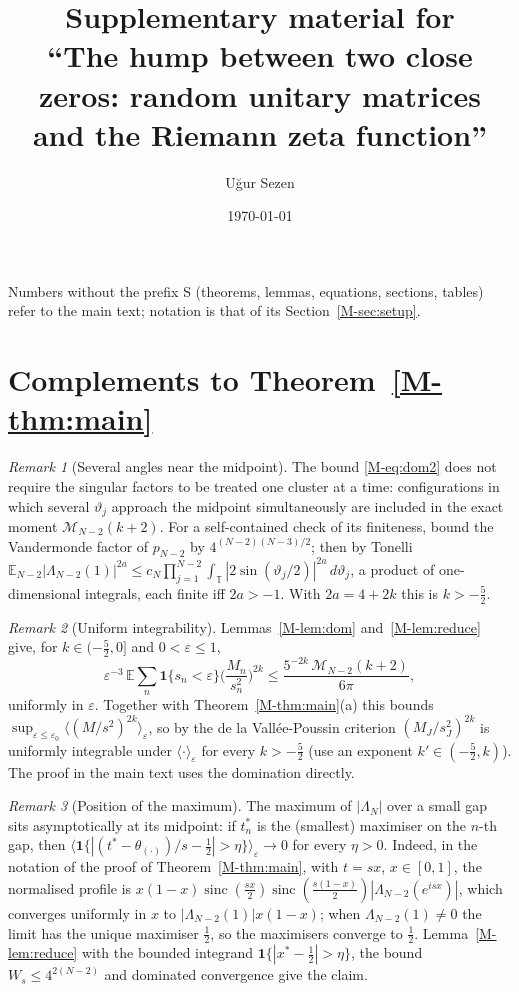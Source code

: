 \documentclass[12pt]{amsart}
\title[Supplementary material]{Supplementary material for\\ ``The hump
between two close zeros: random unitary matrices and the Riemann zeta
function''}
\author{U\u{g}ur Sezen}
\date{\today}
\theoremstyle{remark}
\newtheorem{remark}{Remark}
\newcommand{\E}{\mathbb{E}}
\newcommand{\eps}{\varepsilon}
\newcommand{\T}{\mathbb{T}}
\newcommand{\1}{\mathbf{1}}
\newcommand{\sinc}{\operatorname{sinc}}
\begin{document}
\maketitle

Numbers without the prefix S (theorems, lemmas, equations, sections,
tables) refer to the main text; notation is that of its
Section~\ref{M-sec:setup}.

\section{Complements to Theorem~\ref{M-thm:main}}\label{sec:thm1supp}

\begin{remark}[Several angles near the midpoint]\label{rem:multi}
The bound \eqref{M-eq:dom2} does not require the singular factors to be
treated one cluster at a time: configurations in which several
$\vartheta_j$ approach the midpoint simultaneously are included in the
exact moment $\mathcal M_{N-2}(k+2)$. For a self-contained check of its
finiteness, bound the Vandermonde factor of $p_{N-2}$ by
$4^{(N-2)(N-3)/2}$; then by Tonelli
$\E_{N-2}|\Lambda_{N-2}(1)|^{2a}\le c_N\prod_{j=1}^{N-2}
\int_{\T}|2\sin(\vartheta_j/2)|^{2a}\,d\vartheta_j$, a product of
one-dimensional integrals, each finite iff $2a>-1$. With $2a=4+2k$ this is
$k>-\frac52$.
\end{remark}

\begin{remark}[Uniform integrability]\label{rem:UI}
Lemmas~\ref{M-lem:dom} and~\ref{M-lem:reduce} give, for
$k\in(-\frac52,0]$ and $0<\eps\le1$,
\[
\eps^{-3}\,\E\sum_n\1\{s_n<\eps\}\Big(\frac{M_n}{s_n^2}\Big)^{2k}
\le\frac{5^{-2k}\,\mathcal M_{N-2}(k+2)}{6\pi},
\]
uniformly in $\eps$. Together with Theorem~\ref{M-thm:main}(a) this bounds
$\sup_{\eps\le\eps_0}\langle(M/s^2)^{2k}\rangle_\eps$, so by the de la
Vall\'ee-Poussin criterion $(M_J/s_J^2)^{2k}$ is uniformly integrable
under $\langle\cdot\rangle_\eps$ for every $k>-\frac52$ (use an exponent
$k'\in(-\frac52,k)$). The proof in the main text uses the domination
directly.
\end{remark}

\begin{remark}[Position of the maximum]\label{rem:position}
The maximum of $|\Lambda_N|$ over a small gap sits asymptotically at its
midpoint: if $t_n^*$ is the (smallest) maximiser on the $n$-th gap, then
$\langle\1\{|(t^*-\theta_{(\cdot)})/s-\frac12|>\eta\}\rangle_\eps\to0$ for every
$\eta>0$. Indeed, in the notation of the proof of
Theorem~\ref{M-thm:main}, with $t=sx$, $x\in[0,1]$, the normalised profile
is $x(1-x)\sinc(\frac{sx}2)\sinc(\frac{s(1-x)}2)|\Lambda_{N-2}(e^{isx})|$,
which converges uniformly in $x$ to $|\Lambda_{N-2}(1)|x(1-x)$; when
$\Lambda_{N-2}(1)\ne0$ the limit has the unique maximiser $\frac12$, so the
maximisers converge to $\frac12$. Lemma~\ref{M-lem:reduce} with the bounded
integrand $\1\{|x^*-\frac12|>\eta\}$, the bound $W_s\le4^{2(N-2)}$ and
dominated convergence give the claim.
\end{remark}
\end{document}
